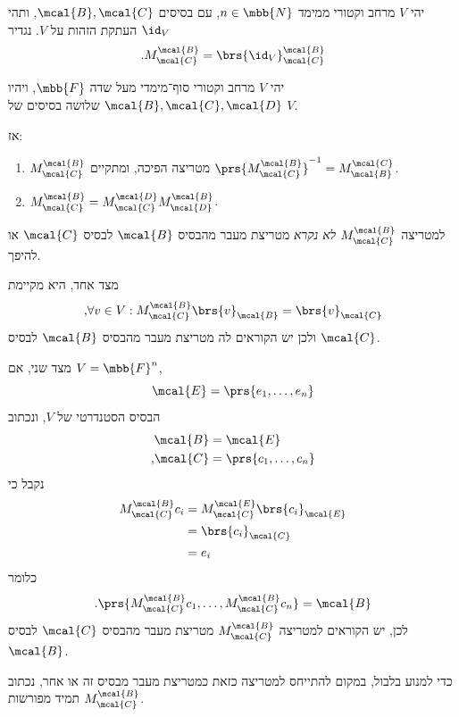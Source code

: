 \documentclass[a4paper,10pt,twoside,openany]{article}
\begin{document}
\begin{definition}
יהי
$V$
מרחב וקטורי ממימד
$n \in \mbb{N}$,
עם בסיסים
$\mcal{B},\mcal{C}$,
ותהי
$\id_V$
העתקת הזהות על
$V$.
נגדיר
\begin{align*}
\text{.} M^\mcal{B}_\mcal{C} = \brs{\id_V}^\mcal{B}_\mcal{C}
\end{align*}
\end{definition}

\begin{proposition} \label{proposition:change-of-basis-matrices}
יהי
$V$
מרחב וקטורי סוף־מימדי מעל שדה
$\mbb{F}$,
ויהיו
$\mcal{B}, \mcal{C}, \mcal{D}$
שלושה בסיסים של
$V$.

אז:
\begin{enumerate}
\item $M^\mcal{B}_\mcal{C}$
מטריצה הפיכה, ומתקיים
$\prs{M^\mcal{B}_\mcal{C}}^{-1} = M^\mcal{C}_\mcal{B}$.
\item $M^\mcal{B}_\mcal{C} = M^\mcal{D}_\mcal{C} M^\mcal{B}_\mcal{D}$.
\end{enumerate}
\end{proposition}

\newpage

\begin{remark}
למטריצה
$M^{\mcal{B}}_{\mcal{C}}$
\emph{לא נקרא}
מטריצת מעבר מהבסיס
$\mcal{B}$
לבסיס
$\mcal{C}$
או להיפך.

מצד אחד, היא מקיימת
\[\text{,} \forall v \in V : M^{\mcal{B}}_{\mcal{C}} \brs{v}_{\mcal{B}} = \brs{v}_{\mcal{C}}\]
ולכן יש הקוראים לה מטריצת מעבר מהבסיס
$\mcal{B}$
לבסיס
$\mcal{C}$.

מצד שני, אם
$V = \mbb{F}^n$,
\[\mcal{E} = \prs{e_1, \ldots, e_n}\]
הבסיס הסטנדרטי של
$V$,
ונכתוב
\begin{align*}
\mcal{B} &= \mcal{E} \\
\text{,} \mcal{C} &= \prs{c_1, \ldots, c_n}
\end{align*}
נקבל כי
\begin{align*}
M^{\mcal{B}}_{\mcal{C}} c_i &= M^{\mcal{E}}_{\mcal{C}} \brs{c_i}_{\mcal{E}}
\\&= \brs{c_i}_{\mcal{C}}
\\&= e_i
\end{align*}
כלומר
\begin{align*}
\text{.} \prs{M^{\mcal{B}}_{\mcal{C}} c_1, \ldots, M^{\mcal{B}}_{\mcal{C}} c_n} = \mcal{B}
\end{align*}
לכן, יש הקוראים למטריצה
$M^\mcal{B}_\mcal{C}$
מטריצת מעבר מהבסיס
$\mcal{C}$
לבסיס
$\mcal{B}$.

כדי למנוע בלבול, במקום להתייחס למטריצה כזאת כמטריצת מעבר מבסיס זה או אחר, נכתוב תמיד מפורשות
$M^\mcal{B}_\mcal{C}$.
\end{remark}
\end{document}
